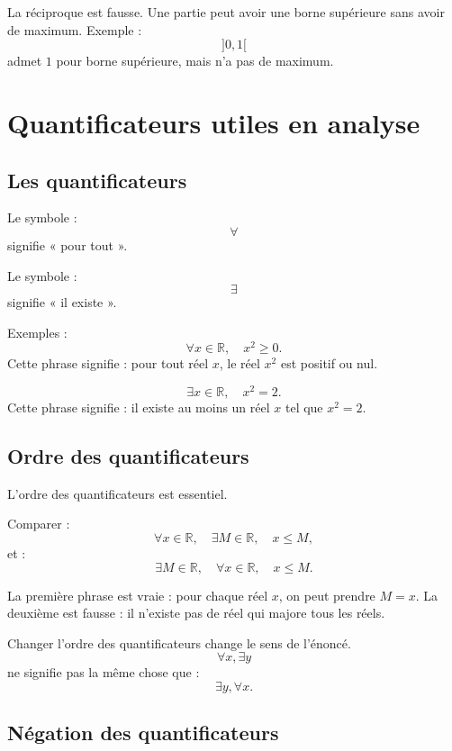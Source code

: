 \documentclass[11pt,a4paper]{article}
\newcommand{\R}{\mathbb R}
\begin{document}
\begin{erreurbox}
La réciproque est fausse.  
Une partie peut avoir une borne supérieure sans avoir de maximum.  
Exemple :
\[
]0,1[
\]
admet \(1\) pour borne supérieure, mais n'a pas de maximum.
\end{erreurbox}

\section{Quantificateurs utiles en analyse}

\subsection{Les quantificateurs}

\begin{definitionbox}[Quantificateurs]
Le symbole :
\[
\forall
\]
signifie « pour tout ».

Le symbole :
\[
\exists
\]
signifie « il existe ».
\end{definitionbox}

Exemples :
\[
\forall x\in\R,\quad x^2\geq0.
\]
Cette phrase signifie : pour tout réel \(x\), le réel \(x^2\) est positif ou nul.

\[
\exists x\in\R,\quad x^2=2.
\]
Cette phrase signifie : il existe au moins un réel \(x\) tel que \(x^2=2\).

\subsection{Ordre des quantificateurs}

L'ordre des quantificateurs est essentiel.

Comparer :
\[
\forall x\in\R,\quad \exists M\in\R,\quad x\leq M,
\]
et :
\[
\exists M\in\R,\quad \forall x\in\R,\quad x\leq M.
\]

La première phrase est vraie : pour chaque réel \(x\), on peut prendre \(M=x\).  
La deuxième est fausse : il n'existe pas de réel qui majore tous les réels.

\begin{erreurbox}
Changer l'ordre des quantificateurs change le sens de l'énoncé.
\[
\forall x,\exists y
\]
ne signifie pas la même chose que :
\[
\exists y,\forall x.
\]
\end{erreurbox}

\subsection{Négation des quantificateurs}
\end{document}
